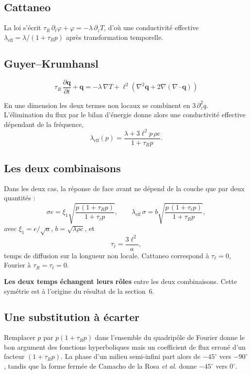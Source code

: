 \documentclass[11pt,a4paper]{article}
\begin{document}
\subsection{Cattaneo}

La loi s'écrit $\tau_R\,\partial_t\varphi + \varphi = -\lambda\,\partial_z T$, d'où une conductivité
effective $\lambda_{\mathrm{eff}} = \lambda/(1+\tau_R p)$ après transformation temporelle.

\subsection{Guyer--Krumhansl}

\[ \tau_R\,\frac{\partial \mathbf{q}}{\partial t} + \mathbf{q}
= -\lambda\,\nabla T + \ell^2\left(\nabla^2\mathbf{q} + 2\nabla(\nabla\cdot\mathbf{q})\right) \]

En une dimension les deux termes non locaux se combinent en $3\,\partial_z^2 q$. L'élimination du
flux par le bilan d'énergie donne alors une conductivité effective dépendant de la fréquence,
\[ \lambda_{\mathrm{eff}}(p) = \frac{\lambda + 3\ell^2 p\,\rho c}{1 + \tau_R p} . \]

\subsection{Les deux combinaisons}

Dans les deux cas, la réponse de face avant ne dépend de la couche que par deux quantités :
\[ \sigma e = \xi_1 \sqrt{\frac{p\,(1+\tau_R p)}{1+\tau_\ell p}} ,
\qquad
\lambda_{\mathrm{eff}}\,\sigma = b \sqrt{\frac{p\,(1+\tau_\ell p)}{1+\tau_R p}} , \]
avec $\xi_1 = e/\sqrt{a}$, $b = \sqrt{\lambda\rho c}$, et
\[ \tau_\ell = \frac{3\ell^2}{a} , \]
temps de diffusion sur la longueur non locale. Cattaneo correspond à $\tau_\ell = 0$, Fourier à
$\tau_R = \tau_\ell = 0$.

\textbf{Les deux temps échangent leurs rôles} entre les deux combinaisons. Cette symétrie est à
l'origine du résultat de la section~6.

\subsection{Une substitution à écarter}

Remplacer $p$ par $p(1+\tau_R p)$ dans l'ensemble du quadripôle de Fourier donne le bon argument des
fonctions hyperboliques mais un coefficient de flux erroné d'un facteur $(1+\tau_R p)$. La phase
d'un milieu semi-infini part alors de $-45^\circ$ vers $-90^\circ$, tandis que la forme fermée de
Camacho de la Rosa \emph{et al.} donne $-45^\circ$ vers $0^\circ$.
\end{document}

